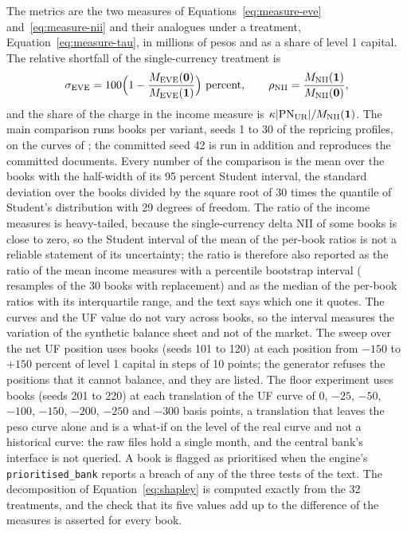 The metrics are the two measures of Equations~\eqref{eq:measure-eve} and~\eqref{eq:measure-nii} and their analogues under a treatment, Equation~\eqref{eq:measure-tau}, in millions of pesos and as a share of level 1 capital. The relative shortfall of the single-currency treatment is
\begin{equation}
\sigma_{\mathrm{EVE}}=100\Bigl(1-\frac{M_{\mathrm{EVE}}(\mathbf 0)}{M_{\mathrm{EVE}}(\mathbf 1)}\Bigr)\ \text{percent},\qquad
\rho_{\mathrm{NII}}=\frac{M_{\mathrm{NII}}(\mathbf 1)}{M_{\mathrm{NII}}(\mathbf 0)},
\label{eq:shortfall}
\end{equation}
and the share of the charge in the income measure is $\kappa|\mathrm{PN}_{\mathrm{UR}}|/M_{\mathrm{NII}}(\mathbf 1)$. The main comparison runs \mainSeeds{} books per variant, seeds 1 to 30 of the repricing profiles, on the curves of \valDate{}; the committed seed 42 is run in addition and reproduces the committed documents. Every number of the comparison is the mean over the books with the half-width of its 95 percent Student interval, the standard deviation over the books divided by the square root of 30 times the quantile of Student's distribution with 29 degrees of freedom. The ratio of the income measures is heavy-tailed, because the single-currency delta NII of some books is close to zero, so the Student interval of the mean of the per-book ratios is not a reliable statement of its uncertainty; the ratio is therefore also reported as the ratio of the mean income measures with a percentile bootstrap interval (\rmResamples{} resamples of the 30 books with replacement) and as the median of the per-book ratios with its interquartile range, and the text says which one it quotes. The curves and the UF value do not vary across books, so the interval measures the variation of the synthetic balance sheet and not of the market. The sweep over the net UF position uses \sweepSeeds{} books (seeds 101 to 120) at each position from $-150$ to $+150$ percent of level 1 capital in steps of 10 points; the generator refuses the positions that it cannot balance, and they are listed. The floor experiment uses \floorsSeeds{} books (seeds 201 to 220) at each translation of the UF curve of 0, $-25$, $-50$, $-100$, $-150$, $-200$, $-250$ and $-300$ basis points, a translation that leaves the peso curve alone and is a what-if on the level of the real curve and not a historical curve: the raw files hold a single month, and the central bank's interface is not queried. A book is flagged as prioritised when the engine's \texttt{prioritised\_bank} reports a breach of any of the three tests of the text. The decomposition of Equation~\eqref{eq:shapley} is computed exactly from the 32 treatments, and the check that its five values add up to the difference of the measures is asserted for every book.

